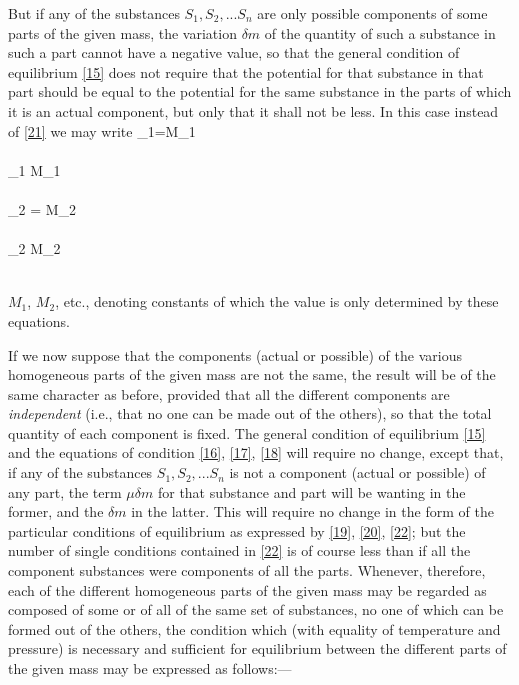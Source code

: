 \documentclass[12pt]{article}
\begin{document}
But if any of the substances $S_1, S_2, ... S_n$ are only possible components of some parts of the given mass, the variation $\delta m$ of the quantity of such a substance in such a part cannot have a negative value, so that the general condition of equilibrium \ref{15} does not require that the potential for that substance in that part should be equal to the potential for the same substance in the parts of which it is an actual component, but only that it shall not be less. In this case instead of \ref{21} we may write
\eqs
\mu_1=M_1 \\
 \\
\mu_1 \geq  M_1 \\
\\
\mu_2 =  M_2 \\
\\
\mu_2 \geq  M_2 \\
\\
\label{22} \eqe

$M_1$, $M_2$, etc., denoting constants of which the value is only determined by these equations.

If we now suppose that the components (actual or possible) of the various homogeneous parts of the given mass are not the same, the result will be of the same character as before, provided that all the different components are \textit{independent} (i.e., that no one can be made out of the others), so that the total quantity of each component is fixed. The general condition of equilibrium \ref{15} and the equations of condition \ref{16}, \ref{17}, \ref{18} will require no change, except that, if any of the substances $S_1, S_2, ... S_n$ is not a component (actual or possible) of any part, the term  $\mu \delta m$ for that substance and part will be wanting in the former, and the $\delta m$ in the latter. This will require no change in the form of the particular conditions of equilibrium as expressed by \ref{19}, \ref{20}, \ref{22}; but the number of single conditions contained in \ref{22} is of course less than if all the component substances were components of all the parts. Whenever, therefore, each of the different homogeneous parts of the given mass may be regarded as composed of some or of all of the same set of substances, no one of which can be formed out of the others, the condition which (with equality of temperature and pressure) is necessary and sufficient for equilibrium between the different parts of the given mass may be expressed as follows:---
\end{document}
